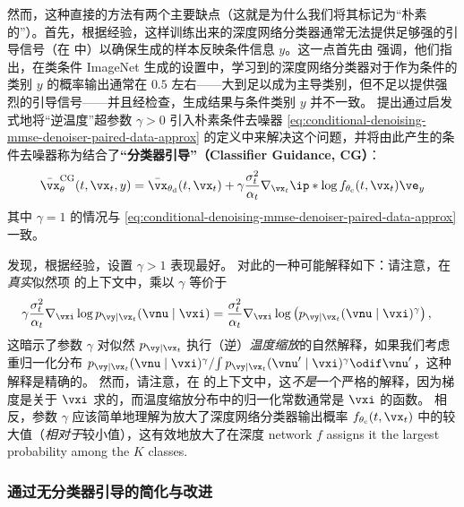 \documentclass[../../book-main_zh.tex]{subfiles}
\begin{document}
然而，这种直接的方法有两个主要缺点（这就是为什么我们将其标记为“朴素的”）。首先，根据经验，这样训练出来的深度网络分类器通常无法提供足够强的引导信号（在
 中）以确保生成的样本反映条件信息 $y$。这一点首先由 \citet{Dhariwal2021-hg} 强调，他们指出，在类条件 ImageNet 生成的设置中，学习到的深度网络分类器对于作为条件的类别 $y$ 的概率输出通常在
$0.5$ 左右——大到足以成为主导类别，但不足以提供强烈的引导信号——并且经检查，生成结果与条件类别 $y$ 并不一致。\citet{Dhariwal2021-hg} 提出通过启发式地将“逆温度”超参数 $\gamma > 0$
引入朴素条件去噪器
\eqref{eq:conditional-denoising-mmse-denoiser-paired-data-approx} 的定义中来解决这个问题，并将由此产生的条件去噪器称为结合了\textbf{“分类器引导”（Classifier Guidance, CG）}：
\begin{equation}\label{eq:conditional-denoising-mmse-denoiser-paired-data-approx-cg}
    \bar{\vx}_{\theta}^{\mathrm{CG}}(t, \vx_t, y)
    =
    \bar{\vx}_{\theta_{\mathrm{d}}}(t, \vx_t)
    + \gamma\frac{\sigma_t^2}{\alpha_t}
    \nabla_{\vx_t}
    \ip*{
        \log f_{\theta_{\mathrm{c}}}(t, \vx_t)
    }{
        \ve_{y}
    }
\end{equation}
其中 $\gamma = 1$ 的情况与
\eqref{eq:conditional-denoising-mmse-denoiser-paired-data-approx} 一致。

\citet{Dhariwal2021-hg} 发现，根据经验，设置 $\gamma > 1$ 表现最好。
对此的一种可能解释如下：请注意，在\textit{真实}似然项
 的上下文中，乘以 $\gamma$ 等价于
\begin{align}
    \gamma\frac{\sigma_t^2}{\alpha_t} \nabla_{\vxi}\log p_{\vy \mid
    \vx_t}(\vnu\mid
    \vxi)
    &=
    \frac{\sigma_t^2}{\alpha_t} \nabla_{\vxi}\log \left(
        p_{\vy \mid \vx_t}(\vnu\mid \vxi)^\gamma
    \right), %
\end{align}
这暗示了参数 $\gamma$ 对似然
$p_{\vy \mid \vx_t}$ 执行（逆）\textit{温度缩放}的自然解释，如果我们考虑重归一化分布
$ { p_{\vy \mid \vx_t}(\vnu\mid \vxi)^\gamma } / { \int p_{\vy \mid
    \vx_t}(\vnu'\mid
\vxi)^\gamma \odif \vnu' } $，这种解释是精确的。
然而，请注意，在  的上下文中，这\textit{不是}一个严格的解释，因为梯度是关于 $\vxi$ 求的，而温度缩放分布中的归一化常数通常是 $\vxi$ 的函数。
相反，参数 $\gamma$ 应该简单地理解为放大了深度网络分类器输出概率
$f_{\theta_{\mathrm{c}}}(t, \vx_t)$ 中的较大值（\textit{相对于}较小值），这有效地放大了在深度
network $f$ assigns it the largest probability among the $K$ classes.

\subsubsection{通过无分类器引导的简化与改进}
\end{document}
